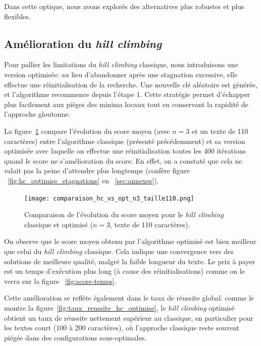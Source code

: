 \documentclass[a4paper]{article}
\begin{document}
Dans cette optique, nous avons explorés des alternatives plus robustes et plus flexibles.


\subsection{Amélioration du \textit{hill climbing}}

Pour pallier les limitations du \textit{hill climbing} classique, nous introduisons une version optimisée: au lieu d’abandonner après une
stagnation excessive, elle effectue une réinitialisation de la recherche. Une nouvelle clé aléatoire est
générée, et l’algorithme recommence depuis l’étape 1. Cette stratégie permet d’échapper plus facilement aux pièges des minima locaux tout en conservant la rapidité de l’approche gloutonne.

La figure~\ref{fig:hc_optimise_score} compare l’évolution du score moyen (avec $n=3$ et un texte de 110 caractères) entre l’algorithme classique (présenté précédemment) et sa version optimisée avec laquelle on effectue une réinitialisation toutes les 400 itérations quand le score ne s'amélioration du score. En effet, on a constaté que cela ne valait pas la peine d'attendre plus longtemps (confère figure ~\ref{fig:hc_optimise_stagnations} en ~\ref{sec:annexes}).

\begin{figure}[H]
    \centering
    \texttt{[image: comparaison\_hc\_vs\_opt\_n3\_taille110.png]}
    \caption{Comparaison de l’évolution du score moyen pour le \textit{hill climbing} classique et optimisé ($n=3$, texte de 110 caractères).}
    \label{fig:hc_optimise_score}
\end{figure}

On observe que le score moyen obtenu par l’algorithme optimisé est bien meilleur que celui du \textit{hill climbing} classique. Cela indique une convergence vers des solutions de meilleure qualité, malgré la faible longueur du texte. Le prix à payer est un temps d'exécution plus long (à cause des réinitialisations) comme on le verra sur la figure ~\ref{fig:score-temps}.

Cette amélioration se reflète également dans le taux de réussite global: comme le montre la figure~\ref{fig:taux_reussite_hc_optimise}, le \textit{hill climbing} optimisé obtient un taux de réussite nettement supérieur au classique, en particulier pour les textes court (100 à 200 caractères), où l’approche classique reste souvent piégée dans des configurations sous-optimales.
\end{document}
